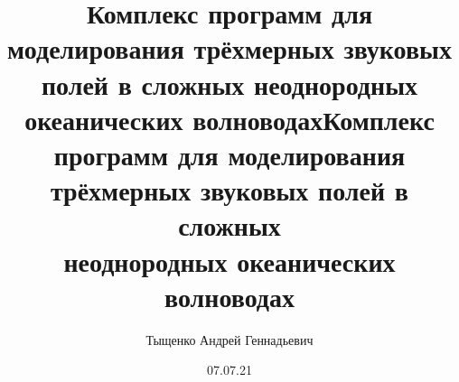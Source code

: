 \documentclass{fefu}
\author{Тыщенко Андрей Геннадьевич}
\title{Комплекс программ для моделирования трёхмерных звуковых полей в сложных неоднородных океанических волноводах}
\date{07.07.21}
\newif\ifreviewsonly
\begin{document}
    \ifreviewsonly
        \begingroup
            \setreviewer{Луньков Андрей Аллександрович}{зав. лаб. гидрофизики НЦВИ ИОФ РАН, к.ф.-м.н.}
            \title{Комплекс программ для моделирования трёхмерных звуковых полей в сложных\hfill\null\\ неоднородных океанических волноводах\hfill\null}
            
            
        \endgroup
    \else
        \makethesistitlebackside[1.2]
        \title{Комплекс программ для моделирования трёхмерных звуковых полей в сложных\hfill\null\\ неоднородных океанических волноводах\hfill\null}
        
        \setcounter{page}{4}
        
        \tableofcontents
        
        \newpage
        \printglossary[type=\acronymtype,title={Глоссарий}]
        \newpage
        
        \newpage
        
        \newpage
        
        \newpage
        
        \newpage
        \printbibliography
        \newpage
        
    \fi
\end{document}
